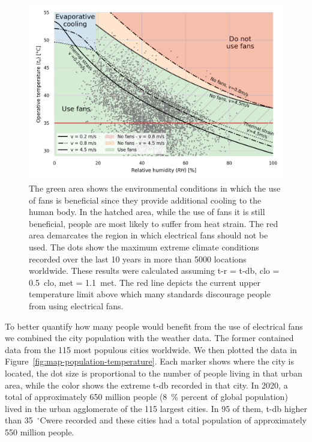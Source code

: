 \begin{figure}[thb!]
    \centering
    \includegraphics[width=\textwidth]{figures/use_fans}
    \caption{The green area shows the environmental conditions in which the use of fans is beneficial since they provide additional cooling to the human body.
    In the hatched area, while the use of fans it is still beneficial, people are most likely to suffer from heat strain.
    The red area demarcates the region in which electrical fans should not be used.
    The dots show the maximum extreme climate conditions recorded over the last 10 years in more than 5000 locations worldwide.
     These results were calculated assuming \ac{t-r} = \ac{t-db}, \ac{clo} = 0.5~clo, \ac{met} = 1.1~met.
    The red line depicts the current upper temperature limit above which many standards discourage people from using electrical fans.}
    \label{fig:energy_storage_delta}
\end{figure}


To better quantify how many people would benefit from the use of electrical fans we combined the city population with the weather data.
The former contained data from the 115 most populous cities worldwide.
We then plotted the data in Figure~\ref{fig:map-population-temperature}.
Each marker shows where the city is located, the dot size is proportional to the number of people living in that urban area, while the color shows the extreme \ac{t-db} recorded in that city.
In 2020, a total of approximately 650 million people (8~\% percent of global population) lived in the urban agglomerate of the 115 largest cities.
In 95 of them, \ac{t-db} higher than 35~$^{\circ}$C\@ were recorded and these cities had a total population of approximately 550 million people.

